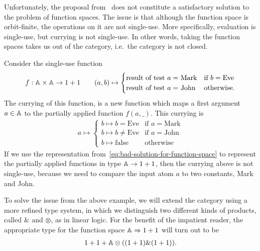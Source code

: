 Unfortunately, the proposal from~\cite{stefanski-phd} does not constitute a satisfactory solution to the problem of function spaces. The issue is that although the function space  is orbit-finite, the operations on it are not single-use. More specifically, evaluation is single-use, but currying is not single-use. In other words, taking the function spaces takes us out of the category, i.e.~the category is not closed.


\begin{example}
    Consider  the single-use function
    \begin{align*}
    f : \mathbb A \times \mathbb A \to 1 + 1 \qquad (a,b)  
    \mapsto \begin{cases}
        \text{result of test $a = $ Mark} & \text{if } b = \text{Eve} \\
        \text{result of test $a = $ John} & \text{otherwise}.
        \end{cases}
    \end{align*}
The currying of this function, is a new function which  maps a first argument $a \in \mathbb A$ to the partially applied function $f(a,\_)$. This currying is
\begin{align*}
    a \mapsto \begin{cases}
        b \mapsto b = \text{Eve} & \text{if } a = \text{Mark} \\
        b \mapsto b \neq \text{Eve} & \text{if } a = \text{John} \\
        b \mapsto \text{false} & \text{otherwise}
        \end{cases}
\end{align*}
If we use the representation from~\eqref{eq:bad-solution-for-function-space} to represent the partially applied functions in type $\mathbb A \to 1+1$, then the currying above  is not single-use, because we need to compare the input atom $a$ to two constants, Mark and John. 
\end{example}

To solve the issue from the above example, we will  extend the category using a more refined type system, in which we distinguish two different kinds of products, called $\&$ and $\otimes$, as in linear logic. For the  benefit of the impatient reader,   the appropriate type for the function space $\mathbb A \Rightarrow 1+1$ will turn out to be 
\begin{align*}
1 + 1 + \mathbb A \otimes ((1+1) \& (1+1)).
\end{align*}

